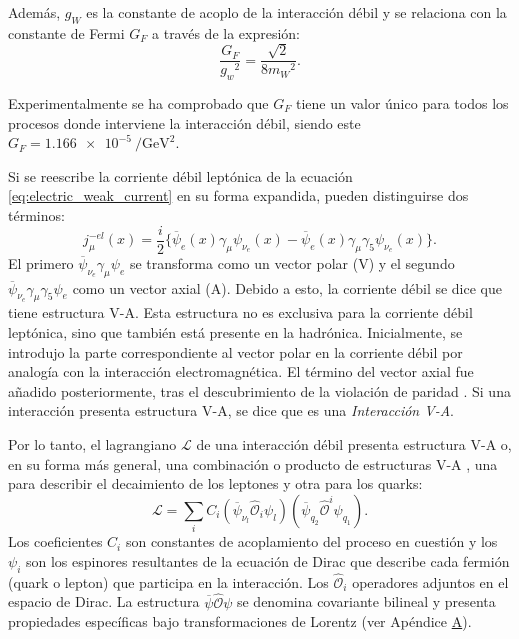 Además, $g_W$ es la constante de acoplo de la interacción débil y se relaciona con la constante de Fermi $G_F$ a través de la expresión:
\begin{equation}
\dfrac{G_{F}}{{g_{w}}^2}=\dfrac{\sqrt{2}}{8{m_{W}}^2}.\label{eq:fermi_coupling}
\end{equation}

Experimentalmente se ha comprobado que $G_F$ tiene un valor único para todos los procesos donde interviene la interacción débil, siendo este $G_{F}= \SI{1,166e-5}{\per\GeV\squared}$.

Si se reescribe la corriente débil leptónica de la ecuación \ref{eq:electric_weak_current} en su forma expandida, pueden distinguirse dos términos:
\begin{equation}
j_{\mu}^{-el}\left(x\right)= \dfrac{i}{2} \{ \overline{\psi}_{e}\left(x\right)\gamma _{\mu}\psi_{{\nu}_{e}}\left( x\right)- \overline{\psi}_{e}\left(x\right)\gamma _{\mu}\gamma_{5}\psi_{{\nu}_{e}}\left( x\right) \} .
\end{equation}
El primero $\overline{\psi}_{{\nu}_{e}}\gamma _{\mu}\psi_{e}$ se transforma como un vector polar (V) y el segundo $\overline{\psi}_{{\nu}_{e}}\gamma _{\mu}\gamma_{5}\psi_{e}$ como un vector axial (A). Debido a esto, la corriente débil se dice que tiene estructura V-A. Esta estructura no es exclusiva para la corriente débil leptónica, sino que también está presente en la hadrónica. Inicialmente, se introdujo la parte correspondiente al vector polar en la corriente débil por analogía con la interacción electromagnética. El término del vector axial fue añadido posteriormente, tras el descubrimiento de la violación de paridad \cite{Paschos}. Si una interacción presenta estructura V-A, se dice que es una \textit{Interacción V-A}.

Por lo tanto, el lagrangiano $\mathcal{L}$ de una interacción débil presenta estructura V-A o, en su forma más general, una combinación o producto de estructuras V-A \cite{Renton}, una para describir el decaimiento de los leptones y otra para los quarks:
\begin{equation}
\mathcal{L}= \sum _{i} C_{i}\left(\overline{\psi}_{\nu_l}\widehat{\mathcal{O}}_{i}\psi _{l}\right)\left( \overline{\psi }_{q_2}\widehat{\mathcal{O}}^{i}\psi _{q_1}\right) .
\end{equation}
Los coeficientes $C_i$ son constantes de acoplamiento del proceso en cuestión y los $\psi_i$ son los espinores resultantes de la ecuación de Dirac que describe cada fermión (quark o lepton) que participa en la interacción. Los $\widehat{\mathcal{O}}_{i}$ operadores adjuntos en el espacio de Dirac. La estructura $\overline{\psi}\widehat{\mathcal{O}}\psi$ se denomina covariante bilineal y presenta propiedades específicas bajo transformaciones de Lorentz (ver Apéndice \hyperref[cap:A]{A}).

